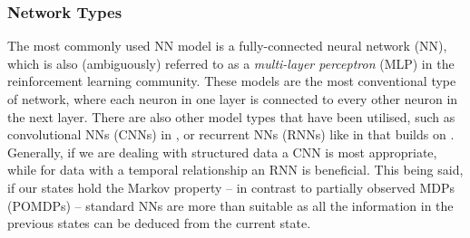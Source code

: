 \subsubsection{Network Types}
The most commonly used NN model is a fully-connected neural network (NN), which is also (ambiguously) referred to as a \textit{multi-layer perceptron} (MLP) in the reinforcement learning community. These models are the most conventional type of network, where each neuron in one layer is connected to every other neuron in the next layer.
There are also other model types that have been utilised, such as convolutional NNs (CNNs) in \cite{DQN}, or recurrent NNs (RNNs) like in \cite{Chen2016DRQN} that builds on \cite{DQN}. Generally, if we are dealing with structured data a CNN is most appropriate, while for data with a temporal relationship an RNN is beneficial. This being said, if our states hold the Markov property -- in contrast to partially observed MDPs (POMDPs) -- standard NNs are more than suitable as all the information in the previous states can be deduced from the current state.


